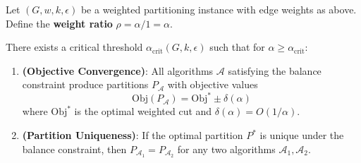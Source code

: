 \begin{theorem}
\label{thm:convergence}
Let $(G, w, k, \epsilon)$ be a weighted partitioning instance with edge weights as above. Define the \textbf{weight ratio} $\rho = \alpha / 1 = \alpha$.

There exists a critical threshold $\alpha_{\text{crit}}(G, k, \epsilon)$ such that for $\alpha \geq \alpha_{\text{crit}}$:

\begin{enumerate}
    \item \textbf{(Objective Convergence)}: All algorithms $\mathcal{A}$ satisfying the balance constraint produce partitions $P_\mathcal{A}$ with objective values
    \[
    \text{Obj}(P_{\mathcal{A}}) = \text{Obj}^* \pm \delta(\alpha)
    \]
    where $\text{Obj}^*$ is the optimal weighted cut and $\delta(\alpha) = O(1/\alpha)$.

    \item \textbf{(Partition Uniqueness)}: If the optimal partition $P^*$ is unique under the balance constraint, then $P_{\mathcal{A}_1} = P_{\mathcal{A}_2}$ for any two algorithms $\mathcal{A}_1, \mathcal{A}_2$.
\end{enumerate}
\end{theorem}

